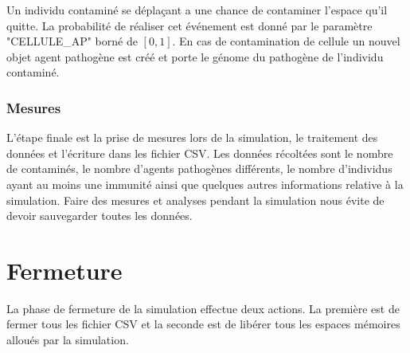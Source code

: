 Un individu contaminé se déplaçant a une chance de contaminer l'espace qu'il quitte. La probabilité de réaliser cet événement est donné par le paramètre {\small "CELLULE\_AP"} borné de $[0,1]$. En cas de contamination de cellule un nouvel objet agent pathogène est créé et porte le génome du pathogène de l'individu contaminé. 

\subsubsection{Mesures}

L'étape finale est la prise de mesures lors de la simulation, le traitement des données et l'écriture dans les fichier CSV. Les données récoltées sont le nombre de contaminés, le nombre d'agents pathogènes différents, le nombre d'individus ayant au moins une immunité ainsi que quelques autres informations relative à la simulation. Faire des mesures et analyses pendant la simulation nous évite de devoir sauvegarder toutes les données.\\

\section{Fermeture}

La phase de fermeture de la simulation effectue deux actions. La première est de fermer tous les fichier CSV et la seconde est de libérer tous les espaces mémoires alloués par la simulation.